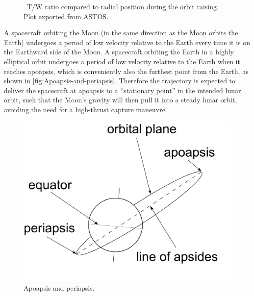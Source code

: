 \begin{figure}
\centering
%
\caption{\BW\ T/W ratio compared to radial position during the orbit raising. Plot exported from ASTOS.}
\label{fig:BW1-T/W-ratio}
\end{figure}

A spacecraft orbiting the Moon (in the same direction as the Moon orbits the Earth) undergoes a period of low velocity relative to the Earth every time it is on the Earthward side of the Moon. A spacecraft orbiting the Earth in a highly elliptical orbit undergoes a period of low velocity relative to the Earth when it reaches apoapsis, which is conveniently also the furthest point from the Earth, as shown in \autoref{fig:Apoapsis-and-periapsis}. Therefore the trajectory is expected to deliver the spacecraft at apoapsis to a \enquote{stationary point} in the intended lunar orbit, such that the Moon's gravity will then pull it into a steady lunar orbit, avoiding the need for a high-thrust capture maneuvre.

\begin{figure}
\centering
\includegraphics[scale=0.4]{Images/apsides.pdf}
\caption{Apoapsis and periapsis.}
\label{fig:Apoapsis-and-periapsis}
\end{figure}

